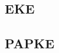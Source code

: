 \documentclass[../main.tex]{subfiles}
\begin{document}
\subsection{EKE}
\subsection{PAPKE}
\end{document}
